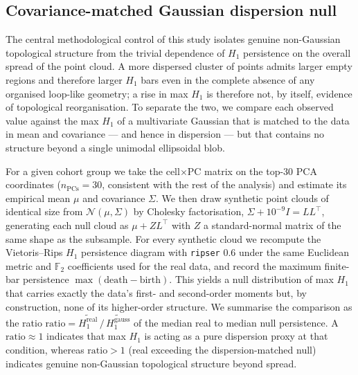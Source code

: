 
\subsection*{Covariance-matched Gaussian dispersion null}

The central methodological control of this study isolates genuine
non-Gaussian topological structure from the trivial dependence of
$H_1$ persistence on the overall spread of the point cloud. A more
dispersed cluster of points admits larger empty regions and therefore
larger $H_1$ bars even in the complete absence of any organised
loop-like geometry; a rise in max $H_1$ is therefore not, by itself,
evidence of topological reorganisation. To separate the two, we
compare each observed value against the max $H_1$ of a multivariate
Gaussian that is matched to the data in mean and covariance --- and
hence in dispersion --- but that contains no structure beyond a single
unimodal ellipsoidal blob.

For a given cohort group we take the cell$\times$PC matrix on the
top-30 PCA coordinates ($n_{\text{PCs}} = 30$, consistent with the
rest of the analysis) and estimate its empirical mean $\mu$ and
covariance $\Sigma$. We then draw synthetic point clouds of identical
size from $\mathcal{N}(\mu, \Sigma)$ by Cholesky factorisation,
$\Sigma + 10^{-9} I = L L^{\top}$, generating each null cloud as
$\mu + Z L^{\top}$ with $Z$ a standard-normal matrix of the same shape
as the subsample. For every synthetic cloud we recompute the
Vietoris--Rips $H_1$ persistence diagram with \texttt{ripser} 0.6
\citep{bauer2021,tralie2018} under the same Euclidean metric and
$\mathbb{F}_2$ coefficients used for the real data, and record the
maximum finite-bar persistence $\max(\text{death} - \text{birth})$.
This yields a null distribution of max $H_1$ that carries exactly the
data's first- and second-order moments but, by construction, none of
its higher-order structure. We summarise the comparison as the ratio
$\text{ratio} = \widetilde{H_1^{\text{real}}} \,/\,
\widetilde{H_1^{\text{gauss}}}$ of the median real to median null
persistence. A $\text{ratio} \approx 1$ indicates that max $H_1$ is
acting as a pure dispersion proxy at that condition, whereas
$\text{ratio} > 1$ (real exceeding the dispersion-matched null)
indicates genuine non-Gaussian topological structure beyond spread.


